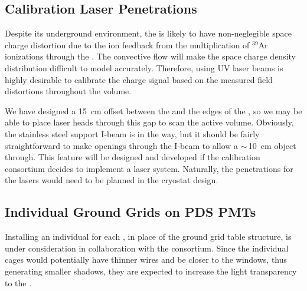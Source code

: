 \subsection{Calibration Laser Penetrations}

Despite its underground environment, the  is likely to have non-neglegible space charge distortion due to the ion feedback from the multiplication of $^{39}$Ar ionizations through the . The  convective flow will make the space charge density distribution difficult to model accurately. Therefore, using UV laser beams is highly desirable to calibrate the charge signal based on the measured field distortions throughout the  volume.

We have designed a \SI{15}{\cm} offset between the  and the edges of the , so we may be able to place laser heads through this gap to scan the  active volume. Obviously, the stainless steel  support I-beam is in the way, but it should be fairly straightforward to make openings through the I-beam 
to allow a $\sim\,$\SI{10}{\cm}  object through. This feature will be designed and developed if the calibration consortium decides to implement a laser system.  Naturally, the penetrations for the lasers would need to be planned in the cryostat design. %

\subsection{Individual Ground Grids on PDS PMTs}

 Installing an individual  for each , in place of the ground grid table structure, is under consideration in collaboration with the  consortium. Since the individual  cages would potentially have thinner wires and be closer to the  windows, thus generating  smaller shadows, they are expected to increase the light transparency to the .

